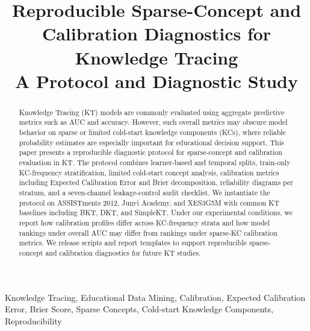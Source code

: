 \documentclass[conference]{IEEEtran}
\begin{document}
\title{Reproducible Sparse-Concept and Calibration Diagnostics for Knowledge Tracing\\
{\large A Protocol and Diagnostic Study}}

\author{
}

\maketitle

\begin{abstract}
Knowledge Tracing (KT) models are commonly evaluated using aggregate predictive metrics such as AUC and accuracy. However, such overall metrics may obscure model behavior on sparse or limited cold-start knowledge components (KCs), where reliable probability estimates are especially important for educational decision support. This paper presents a reproducible diagnostic protocol for sparse-concept and calibration evaluation in KT. The protocol combines learner-based and temporal splits, train-only KC-frequency stratification, limited cold-start concept analysis, calibration metrics including Expected Calibration Error and Brier decomposition, reliability diagrams per stratum, and a seven-channel leakage-control audit checklist. We instantiate the protocol on ASSISTments 2012, Junyi Academy, and XES3G5M with common KT baselines including BKT, DKT, and SimpleKT. Under our experimental conditions, we report how calibration profiles differ across KC-frequency strata and how model rankings under overall AUC may differ from rankings under sparse-KC calibration metrics. We release scripts and report templates to support reproducible sparse-concept and calibration diagnostics for future KT studies.
\end{abstract}

\begin{IEEEkeywords}
Knowledge Tracing, Educational Data Mining, Calibration, Expected Calibration Error, Brier Score, Sparse Concepts, Cold-start Knowledge Components, Reproducibility
\end{IEEEkeywords}
\end{document}
